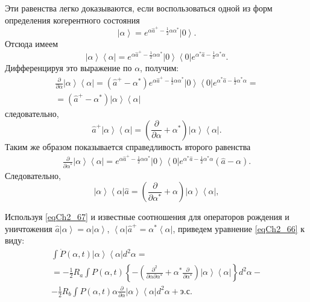 Эти равенства легко доказываются, если воспользоваться одной из форм
определения когерентного состояния
\[
\left|\alpha\right> = e^{\alpha \hat{a}^{+} -
  \frac{1}{2}\alpha\alpha^{*}} \left|0\right>.
\]
Отсюда имеем 
\[
\left|\alpha\right>\left<\alpha\right| = e^{\alpha \hat{a}^{+} -
  \frac{1}{2}\alpha\alpha^{*}} \left|0\right>
\left<0\right|e^{\alpha^{*} \hat{a} -
  \frac{1}{2}\alpha^{*}\alpha}.
\]
Дифференцируя это выражение по $\alpha$,  получим:
\begin{eqnarray}
\frac{\partial}{\partial \alpha}\left|\alpha\right>\left<\alpha\right|
= \left(\hat{a}^{+} -
\alpha^{*}\right) e^{\alpha \hat{a}^{+} -
  \frac{1}{2}\alpha\alpha^{*}} \left|0\right>
\left<0\right|e^{\alpha^{*} \hat{a} -
  \frac{1}{2}\alpha^{*}\alpha} = 
\nonumber \\
= \left(\hat{a}^{+} -
\alpha^{*}\right)\left|\alpha\right>\left<\alpha\right| 
\nonumber
\end{eqnarray}
следовательно,
\begin{equation}
\hat{a}^{+}\left|\alpha\right>\left<\alpha\right| = 
\left(\frac{\partial}{\partial \alpha} +
\alpha^{*}\right)\left|\alpha\right>\left<\alpha\right|.
\label{eqCh2_68}
\end{equation}
Таким же образом показывается справедливость второго равенства
\begin{eqnarray}
\frac{\partial}{\partial \alpha^{*}}\left|\alpha\right>\left<\alpha\right|
=  e^{\alpha \hat{a}^{+} -
  \frac{1}{2}\alpha\alpha^{*}} \left|0\right>
\left<0\right|e^{\alpha^{*} \hat{a} -
  \frac{1}{2}\alpha^{*}\alpha} 
\left(\hat{a} -
\alpha\right). 
\nonumber
\end{eqnarray}
Следовательно,
\begin{equation}
\left|\alpha\right>\left<\alpha\right|\hat{a} = 
\left(\frac{\partial}{\partial \alpha^{*}} +
\alpha\right)\left|\alpha\right>\left<\alpha\right|, 
\label{eqCh2_68a}
\end{equation}

Используя \eqref{eqCh2_67} и известные соотношения для операторов рождения и
уничтожения  $\hat{a}\left|\alpha\right> = \alpha\left|\alpha\right>$,
$\left<\alpha\right|\hat{a}^{+} = \alpha^{*}\left<\alpha\right|$,
приведем уравнение \eqref{eqCh2_66} к виду:   
\begin{eqnarray}
\int \dot{P}\left(\alpha,
t\right)\left|\alpha\right>\left<\alpha\right| d^2 \alpha  = 
\nonumber \\
= -\frac{1}{2}R_a\int
P\left(\alpha,t\right)
\left\{
-\left(
\frac{\partial^2}{\partial \alpha \partial \alpha^{*}} +
\alpha^{*}\frac{\partial}{\partial \alpha^{*}}
\right)
\left|\alpha\right>\left<\alpha\right| 
\right\}
d^2 \alpha - 
\nonumber \\
-\frac{1}{2}R_b\int P\left(\alpha,t\right)
\alpha \frac{\partial}{\partial \alpha}
\left|\alpha\right>\left<\alpha\right| 
d^2 \alpha + \mbox{э.с.}
\label{eqCh2_69}
\end{eqnarray}

